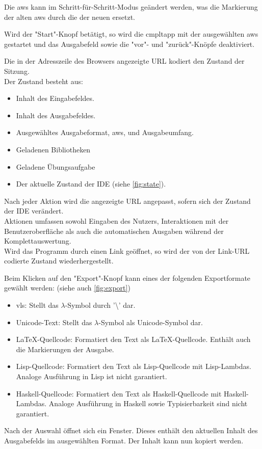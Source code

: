 \documentclass[parskip=full,11pt,twoside]{scrartcl}
\begin{document}
Die \gls{aws} kann im Schritt-für-Schritt-Modus geändert werden, was die Markierung der alten \gls{aws} durch die der neuen ersetzt.

Wird der "Start"-Knopf betätigt, so wird die \gls{cmpltapp} mit der ausgewählten \gls{aws} gestartet und das Ausgabefeld sowie die "vor"- und "zurück"-Knöpfe deaktiviert.

Die in der Adresszeile des Browsers angezeigte URL kodiert den Zustand der Sitzung.\\
Der Zustand besteht aus:
\begin{itemize}
	\item Inhalt des Eingabefeldes.
	\item Inhalt des Ausgabefeldes.
	\item Ausgewähltes Ausgabeformat, \gls{aws}, und Ausgabeumfang.
	\item Geladenen Bibliotheken
	\item Geladene Übungsaufgabe
	\item Der aktuelle Zustand der IDE (siehe \cref{fig:state}).
\end{itemize}
Nach jeder Aktion wird die angezeigte URL angepasst, sofern sich der Zustand der IDE verändert.\\
Aktionen umfassen sowohl Eingaben des Nutzers, Interaktionen mit der Benutzeroberfläche als auch die automatischen Ausgaben während der Komplettauswertung.\\ 
Wird das Programm durch einen Link geöffnet, so wird der von der Link-URL codierte Zustand wiederhergestellt.

Beim Klicken auf den "Export"-Knopf kann eines der folgenden Exportformate gewählt werden: (siehe auch \cref{fig:export})
\begin{itemize}
	\item \gls{vls}: Stellt das $\lambda$-Symbol durch '\textbackslash' dar.
	\item Unicode-Text: Stellt das $\lambda$-Symbol als Unicode-Symbol dar.
	\item \LaTeX-Quellcode: Formatiert den Text als \LaTeX-Quellcode. Enthält auch die Markierungen der Ausgabe.
	\item Lisp-Quellcode: Formatiert den Text als Lisp-Quellcode mit Lisp-Lambdas. Analoge Ausführung in Lisp ist nicht garantiert. 
	\item Haskell-Quellcode: Formatiert den Text als Haskell-Quellcode mit Haskell-Lambdas. Analoge Ausführung in Haskell sowie Typisierbarkeit sind nicht garantiert. 
\end{itemize}
Nach der Auswahl öffnet sich ein Fenster.
Dieses enthält den aktuellen Inhalt des Ausgabefelds im ausgewählten Format.
Der Inhalt kann nun kopiert werden.
\end{document}
